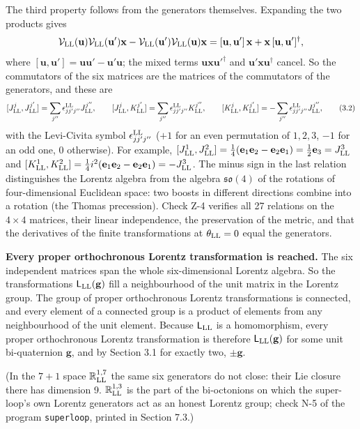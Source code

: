 \documentclass[
  10pt,
]{article}
\begin{document}
The third property follows from the generators themselves. Expanding the
two products gives
\[\mathcal V_{\rm LL}(\mathbf u)\mathcal V_{\rm LL}(\mathbf u')\mathbf x-\mathcal V_{\rm LL}(\mathbf u')\mathcal V_{\rm LL}(\mathbf u)\mathbf x=[\mathbf u,\mathbf u']\,\mathbf x+\mathbf x\,[\mathbf u,\mathbf u']^\dagger,\]
where
\([\mathbf u,\mathbf u']=\mathbf u\mathbf u'-\mathbf u'\mathbf u\); the
mixed terms \(\mathbf u\mathbf x\mathbf u'^\dagger\) and
\(\mathbf u'\mathbf x\mathbf u^\dagger\) cancel. So the commutators of
the six matrices are the matrices of the commutators of the generators,
and these are
\[[J^j_{\rm LL},J^{j'}_{\rm LL}]=\sum_{j''}\epsilon^{\rm LL}_{jj'j''}J^{j''}_{\rm LL},\qquad[J^j_{\rm LL},K^{j'}_{\rm LL}]=\sum_{j''}\epsilon^{\rm LL}_{jj'j''}K^{j''}_{\rm LL},\qquad[K^j_{\rm LL},K^{j'}_{\rm LL}]=-\sum_{j''}\epsilon^{\rm LL}_{jj'j''}J^{j''}_{\rm LL}, \tag{3.2}\]
with the Levi-Civita symbol \(\epsilon^{\rm LL}_{jj'j''}\) (\(+1\) for
an even permutation of \(1,2,3\), \(-1\) for an odd one, 0 otherwise).
For example,
\([J^1_{\rm LL},J^2_{\rm LL}]=\tfrac14(\mathbf e_1\mathbf e_2-\mathbf e_2\mathbf e_1)=\tfrac12\mathbf e_3=J^3_{\rm LL}\)
and
\([K^1_{\rm LL},K^2_{\rm LL}]=\tfrac14i^2(\mathbf e_1\mathbf e_2-\mathbf e_2\mathbf e_1)=-J^3_{\rm LL}\).
The minus sign in the last relation distinguishes the Lorentz algebra
from the algebra \(\mathfrak{so}(4)\) of the rotations of
four-dimensional Euclidean space: two boosts in different directions
combine into a rotation (the Thomas precession). Check Z-4 verifies all
27 relations on the \(4\times4\) matrices, their linear independence,
the preservation of the metric, and that the derivatives of the finite
transformations at \(\theta_{\rm LL}=0\) equal the generators.

\textbf{Every proper orthochronous Lorentz transformation is reached.}
The six independent matrices span the whole six-dimensional Lorentz
algebra. So the transformations \(\mathsf L_{\rm LL}(\mathbf g)\) fill a
neighbourhood of the unit matrix in the Lorentz group. The group of
proper orthochronous Lorentz transformations is connected, and every
element of a connected group is a product of elements from any
neighbourhood of the unit element. Because \(\mathsf L_{\rm LL}\) is a
homomorphism, every proper orthochronous Lorentz transformation is
therefore \(\mathsf L_{\rm LL}(\mathbf g)\) for some unit bi-quaternion
\(\mathbf g\), and by Section 3.1 for exactly two, \(\pm\mathbf g\).

(In the \(7+1\) space \(\mathbb R^{1,7}_{\rm LL}\) the same six
generators do not close: their Lie closure there has dimension 9.
\(\mathbb R^{1,3}_{\rm LL}\) is the part of the bi-octonions on which
the super-loop's own Lorentz generators act as an honest Lorentz group;
check N-5 of the program \texttt{superloop}, printed in Section 7.3.)
\end{document}
